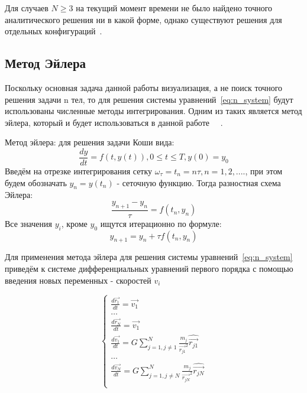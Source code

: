 Для случаев $N \geq 3$ на текущий момент времени не было найдено точного аналитического решения ни в какой форме, однако существуют решения для отдельных конфигураций~\cite{solution3}.

\subsection*{Метод Эйлера}
Поскольку основная задача данной работы визуализация, а не поиск точного решения задачи n тел, то для решения системы уравнений~\ref{eq:n_system} будут использованы численные методы интегрирования. Одним из таких является метод эйлера, который и будет использоваться в данной работе ~\cite{nbody-numeric}~\cite{samarskii}.

Метод эйлера: для решения задачи Коши вида:
\begin{equation}
	\label{eq:koshi}
	\frac{dy}{dt} = f(t, y(t)), 0 \leq t \leq T, y(0) = y_0
\end{equation}
Введём на отрезке интегрирования сетку $\omega_\tau = {t_n = n\tau, n = 1,2,....}$, при этом будем обозначать $y_n = y(t_n)$  - сеточную функцию.
Тогда разностная схема Эйлера:
\begin{equation}
	\label{eq:euler_frac}
	\frac{y_{n+1} - y_n}{\tau} = f(t_n, y_n)
\end{equation}
Все значения $y_i$, кроме $y_0$ ищутся итерационно по формуле:
\begin{equation}
	\label{eq:euler_formula}
	y_{n+1} = y_n + \tau f(t_n, y_n)
\end{equation}

Для применения метода эйлера для решения системы уравнений~\ref{eq:n_system} приведём к системе дифференциальных уравнений первого порядка с помощью введения новых переменных - скоростей $v_i$ 

\begin{equation}
	\label{n_system_velocities}
	\begin{cases}
		\frac{d\vec{r_1}}{dt} = \vec{v_1} \\
		\dots \\
		\frac{d\vec{r_N}}{dt} = \vec{v_1} \\
		
		\frac{d\vec{v_1}}{dt} = G\sum_{j=1, j \neq 1}^{N}{\frac{m_j}{\vec{r_{j1}}^2}\hat{\vec{r_{j1}}}} \\
		\dots \\
		\frac{d\vec{v_N}}{dt} = G\sum_{j=1, j \neq N}^{N}{\frac{m_j}{\vec{r_{jN}}^2}\hat{\vec{r_{jN}}}} \\
	\end{cases}
\end{equation}

